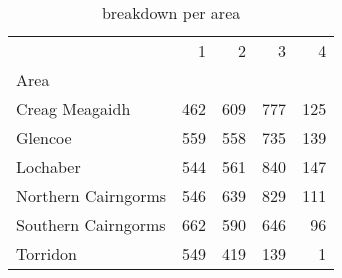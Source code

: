 \begin{table}[H]
\caption{ breakdown per area}
\label{tbl:sais_mapped_hazard_breakdown_per_area}
\begin{tabular}{lrrrr}
\toprule
 & 1 & 2 & 3 & 4 \\
Area &  &  &  &  \\
\midrule
Creag Meagaidh & 462 & 609 & 777 & 125 \\
Glencoe & 559 & 558 & 735 & 139 \\
Lochaber & 544 & 561 & 840 & 147 \\
Northern Cairngorms & 546 & 639 & 829 & 111 \\
Southern Cairngorms & 662 & 590 & 646 & 96 \\
Torridon & 549 & 419 & 139 & 1 \\
\bottomrule
\end{tabular}
\end{table}
